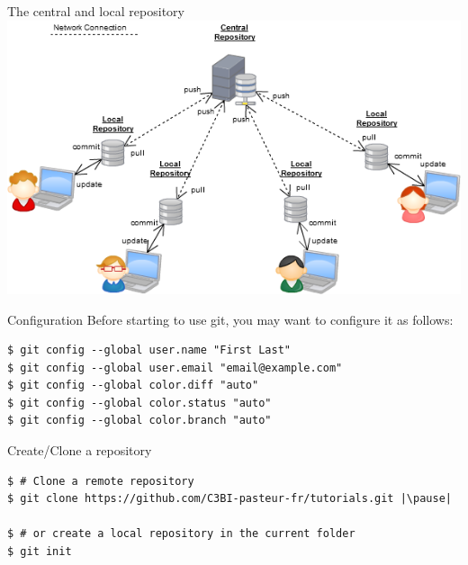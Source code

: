 

\begin{frame}[fragile]{The central and local repository}
  \includegraphics[height=0.9\textheight, width=\textwidth]{images/distributed}
\end{frame}



\begin{frame}[fragile]{Configuration}
Before starting to use git, you may want to configure it as follows:

	\begin{lstlisting}
$ git config --global user.name "First Last"
$ git config --global user.email "email@example.com"
$ git config --global color.diff "auto"
$ git config --global color.status "auto"
$ git config --global color.branch "auto"
	\end{lstlisting}
\end{frame}

\begin{frame}[fragile]{Create/Clone a repository}
	\begin{lstlisting}
$ # Clone a remote repository
$ git clone https://github.com/C3BI-pasteur-fr/tutorials.git |\pause|

$ # or create a local repository in the current folder
$ git init
	\end{lstlisting}
\end{frame}




%
%
%
%
%
%
%

